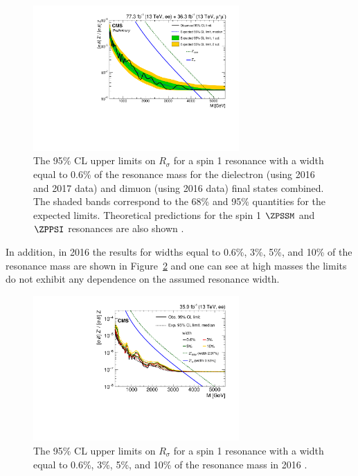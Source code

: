 \begin{figure}[!htb]
\centering
\includegraphics[width=0.7\textwidth]{figures/Zprime/2017/limitInputs/limitPlot_Combination_forApproval.pdf}
 \caption{The 95\% CL upper limits on $R_\sigma$ for a spin 1 resonance with a width equal to 0.6\% of the resonance mass for the dielectron (using 2016 and 2017 data) and dimuon (using 2016 data) final states combined. The shaded bands correspond to the 68\% and 95\% quantities for the expected limits.  Theoretical predictions for the spin 1 $\ZPSSM$ and $\ZPPSI$ resonances are also shown \cite{CMS-PAS-EXO-18-006}.}
\label{fig:limit_comb}
\end{figure}

In addition, in 2016 the results for widths equal to 0.6\%, 3\%, 5\%, and 10\% of the resonance mass are shown in Figure~\ref{fig:limit_ee_width} and one can see at high masses the limits do not exhibit any dependence on the assumed resonance width.
\begin{figure}[!htb]
\centering
\includegraphics[width=0.7\textwidth]{figures/Zprime/2016/paper/Figure_004-a.pdf}
 \caption{The 95\% CL upper limits on $R_\sigma$ for a spin 1 resonance with a width equal to 0.6\%, 3\%, 5\%, and 10\% of the resonance mass in 2016 \cite{Sirunyan2018}.}
\label{fig:limit_ee_width}
\end{figure}

